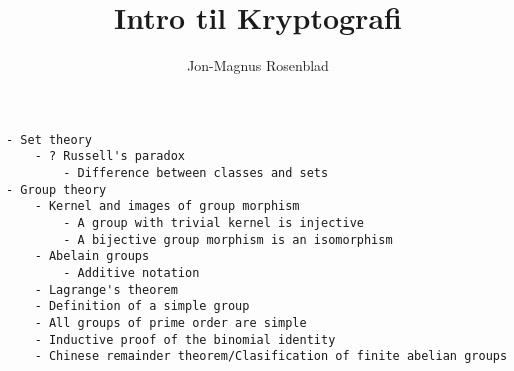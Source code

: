 \documentclass[norks, draft]{article}
\author{Jon-Magnus Rosenblad}
\title{Intro til Kryptografi}
\begin{document}
\maketitle

\tableofcontents
\listoftodos

%








\begin{verbatim}
- Set theory
    - ? Russell's paradox
        - Difference between classes and sets
- Group theory
    - Kernel and images of group morphism
        - A group with trivial kernel is injective
        - A bijective group morphism is an isomorphism
    - Abelain groups
        - Additive notation
    - Lagrange's theorem
    - Definition of a simple group
    - All groups of prime order are simple
    - Inductive proof of the binomial identity
    - Chinese remainder theorem/Clasification of finite abelian groups
\end{verbatim}


\printbibliography
\end{document}
